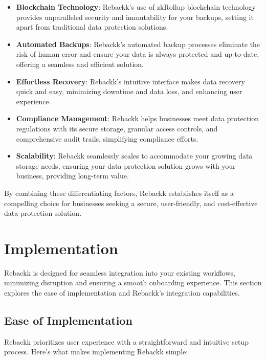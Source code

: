 \documentclass[12pt]{article}
\begin{document}
\begin{itemize}
    \item \textbf{Blockchain Technology}: Rebackk's use of zkRollup blockchain technology provides unparalleled security and immutability for your backups, setting it apart from traditional data protection solutions.
    \item \textbf{Automated Backups}: Rebackk's automated backup processes eliminate the risk of human error and ensure your data is always protected and up-to-date, offering a seamless and efficient solution.
    \item \textbf{Effortless Recovery}: Rebackk's intuitive interface makes data recovery quick and easy, minimizing downtime and data loss, and enhancing user experience.
    \item \textbf{Compliance Management}: Rebackk helps businesses meet data protection regulations with its secure storage, granular access controls, and comprehensive audit trails, simplifying compliance efforts.
    \item \textbf{Scalability}: Rebackk seamlessly scales to accommodate your growing data storage needs, ensuring your data protection solution grows with your business, providing long-term value.
\end{itemize}

By combining these differentiating factors, Rebackk establishes itself as a compelling choice for businesses seeking a secure, user-friendly, and cost-effective data protection solution.

\section{Implementation}
Rebackk is designed for seamless integration into your existing workflows, minimizing disruption and ensuring a smooth onboarding experience. This section explores the ease of implementation and Rebackk's integration capabilities.

\subsection{Ease of Implementation}
Rebackk prioritizes user experience with a straightforward and intuitive setup process. Here's what makes implementing Rebackk simple:
\end{document}
